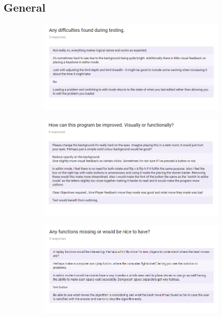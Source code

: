 \documentclass{l4proj}
\begin{document}
\begin{appendices}
\section{General}

\begin{figure}[H]
\centering
\begin{subfigure}[b]{\textwidth}
\centering
\includegraphics[width=\textwidth]{A1-2/4.png}
\end{subfigure}
\end{figure}

\begin{figure}[H]
\centering
\begin{subfigure}[b]{\textwidth}
\centering
\includegraphics[width=\textwidth]{A1-2/5.png}
\end{subfigure}
\end{figure}



\begin{figure}[H]
\centering
\begin{subfigure}[b]{\textwidth}
\centering
\includegraphics[width=\textwidth]{A1-2/6.png}
\end{subfigure}
\end{figure}





\end{appendices}
\end{document}
